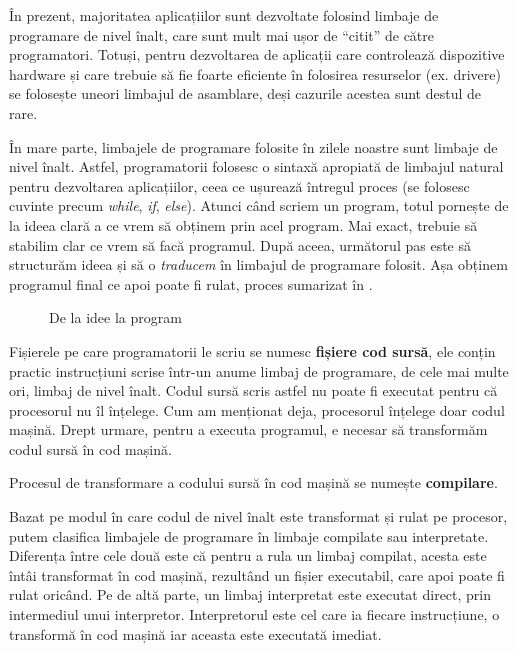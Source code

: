 În prezent, majoritatea aplicațiilor sunt dezvoltate folosind limbaje de
programare de nivel înalt, care sunt mult mai ușor de “citit” de către
programatori. Totuși, pentru dezvoltarea de aplicații care controlează
dispozitive hardware și care trebuie să fie foarte eficiente în folosirea
resurselor (ex. drivere) se folosește uneori limbajul de asamblare, deși
cazurile acestea sunt destul de rare.

În mare parte, limbajele de programare folosite în zilele noastre sunt limbaje
de nivel înalt. Astfel, programatorii folosesc o sintaxă apropiată de limbajul
natural pentru dezvoltarea aplicațiilor, ceea ce ușurează întregul proces (se
folosesc cuvinte precum \textit{while}, \textit{if}, \textit{else}). Atunci
când scriem un program, totul pornește de la ideea clară a ce vrem să obținem
prin acel program. Mai exact, trebuie să stabilim clar ce vrem să facă
programul. După aceea, următorul pas este să structurăm ideea și să o
\textit{traducem} în limbajul de programare folosit. Așa obținem programul final
ce apoi poate fi rulat, proces sumarizat în .

\begin{figure}[htbp]
	\centering
	\def\svgwidth{\columnwidth}
	
        \caption{De la idee la program}
	\label{fig:appdev:idea-to-program}
\end{figure}

Fișierele pe care programatorii le scriu se numesc \textbf{fișiere cod sursă}, ele conțin
practic instrucțiuni scrise într-un anume limbaj de programare, de cele mai
multe ori, limbaj de nivel înalt. Codul sursă scris astfel nu poate fi executat
pentru că procesorul nu îl înțelege. Cum am menționat deja, procesorul înțelege
doar codul mașină. Drept urmare, pentru a executa programul, e necesar să
transformăm codul sursă în cod mașină.

Procesul de transformare a codului sursă în cod mașină se numește \textbf{compilare}.

Bazat pe modul în care codul de nivel înalt este transformat și rulat pe
procesor, putem clasifica limbajele de programare în limbaje compilate sau
interpretate. Diferența între cele două este că pentru a rula un limbaj
compilat, acesta este întâi transformat în cod mașină, rezultând un fișier
executabil, care apoi poate fi rulat oricând. Pe de altă parte, un limbaj
interpretat este executat direct, prin intermediul unui interpretor.
Interpretorul este cel care ia fiecare instrucțiune, o transformă în cod mașină
iar aceasta este executată imediat.

